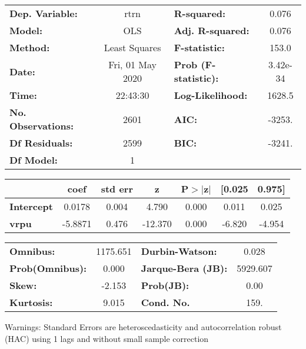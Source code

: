 \begin{center}
\begin{tabular}{lclc}
\toprule
\textbf{Dep. Variable:}    &       rtrn       & \textbf{  R-squared:         } &     0.076   \\
\textbf{Model:}            &       OLS        & \textbf{  Adj. R-squared:    } &     0.076   \\
\textbf{Method:}           &  Least Squares   & \textbf{  F-statistic:       } &     153.0   \\
\textbf{Date:}             & Fri, 01 May 2020 & \textbf{  Prob (F-statistic):} &  3.42e-34   \\
\textbf{Time:}             &     22:43:30     & \textbf{  Log-Likelihood:    } &    1628.5   \\
\textbf{No. Observations:} &        2601      & \textbf{  AIC:               } &    -3253.   \\
\textbf{Df Residuals:}     &        2599      & \textbf{  BIC:               } &    -3241.   \\
\textbf{Df Model:}         &           1      & \textbf{                     } &             \\
\bottomrule
\end{tabular}
\begin{tabular}{lcccccc}
                   & \textbf{coef} & \textbf{std err} & \textbf{z} & \textbf{P$> |$z$|$} & \textbf{[0.025} & \textbf{0.975]}  \\
\midrule
\textbf{Intercept} &       0.0178  &        0.004     &     4.790  &         0.000        &        0.011    &        0.025     \\
\textbf{vrpu}      &      -5.8871  &        0.476     &   -12.370  &         0.000        &       -6.820    &       -4.954     \\
\bottomrule
\end{tabular}
\begin{tabular}{lclc}
\textbf{Omnibus:}       & 1175.651 & \textbf{  Durbin-Watson:     } &    0.028  \\
\textbf{Prob(Omnibus):} &   0.000  & \textbf{  Jarque-Bera (JB):  } & 5929.607  \\
\textbf{Skew:}          &  -2.153  & \textbf{  Prob(JB):          } &     0.00  \\
\textbf{Kurtosis:}      &   9.015  & \textbf{  Cond. No.          } &     159.  \\
\bottomrule
\end{tabular}
\end{center}

Warnings: \newline
 [1] Standard Errors are heteroscedasticity and autocorrelation robust (HAC) using 1 lags and without small sample correction